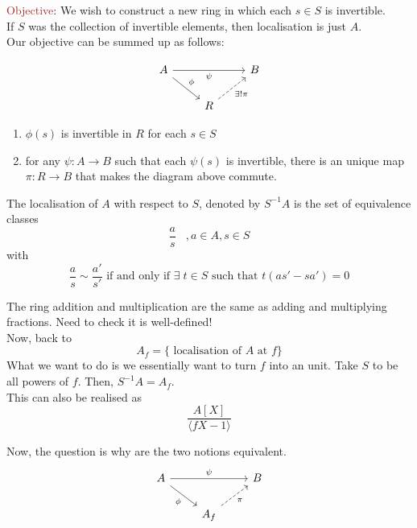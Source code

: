 \documentclass[oneside, 12pt, ]{scrbook}
\theoremstyle{theorem}
\begin{document}
\textcolor{Brown}{Objective}: We wish to construct a new ring in which each $s\in S$ is invertible. \\

If $S$ was the collection of invertible elements, then localisation is just $A$. \\

Our objective can be summed up as follows: 

\[\begin{tikzcd}
	A && B \\
	& R
	\arrow["\psi"', from=1-1, to=1-3]
	\arrow["\phi", from=1-1, to=2-2]
	\arrow["{\exists ! \pi}"', dashed, from=2-2, to=1-3]
\end{tikzcd}\]

\begin{enumerate}
\item $\phi(s)$ is invertible in $R$ for each $s\in S$
\item for any $\psi : A \rightarrow B$ such that each $\psi (s)$ is invertible, there is an unique map $\pi : R \rightarrow B$ that makes the diagram above commute.
\end{enumerate}

\begin{definition}
The localisation of $A$ with respect to $S$, denoted by $S^{-1}A$ is the set of equivalence classes $$\frac{a}{s} \;\;\;, a \in A , s \in S$$ with $$\frac{a}{s} \sim \frac{a'}{s'} \text{ if and only if } \exists \; t \in S \text{ such that } t (as' - sa')=0$$ 
\end{definition}

The ring addition and multiplication are the same as adding and multiplying fractions. Need to check it is well-defined!\\

Now, back to $$A_{f} = \{\text{ localisation of $A$ at }f\}$$ What we want to do is we essentially want to turn $f$ into an unit. Take $S$ to be all powers of $f$. Then, $S^{-1}A = A_{f}$. \\

This can also be realised as $$\frac{A[X]}{\langle fX-1 \rangle}$$

Now, the question is why are the two notions equivalent. 
\[\begin{tikzcd}
	A && B \\
	& {A_{f}}
	\arrow["\psi", from=1-1, to=1-3]
	\arrow["\phi"', from=1-1, to=2-2]
	\arrow["\pi"', dashed, from=2-2, to=1-3]
\end{tikzcd}\]
\end{document}
